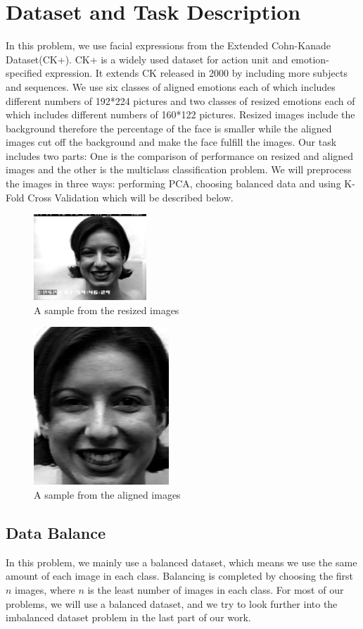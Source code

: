 \documentclass{article} %
\begin{document}
\section{Dataset and Task Description}
In this problem, we use facial expressions from the Extended Cohn-Kanade Dataset(CK+). CK+ is a widely used dataset for action unit
and emotion-specified expression. It extends CK released in 2000 by including more subjects and sequences. We use six classes of aligned emotions each of which includes different numbers of 192*224 pictures and two classes of resized emotions each of which includes different numbers of 160*122 pictures. Resized images include the background therefore the percentage of the face is smaller while the aligned images cut off the background and make the face fulfill the images. 
Our task includes two parts: One is the comparison of performance on resized and aligned images and the other is the multiclass classification problem. We will preprocess the images in three ways: performing PCA, choosing balanced data and using K-Fold Cross Validation which will be described below.
\begin{figure}	
	\centering
	\includegraphics[scale=1]{./graph/resized_sample.png}
	\caption{A sample from the resized images}
\end{figure}
\begin{figure}	
	\centering
	\includegraphics[scale=0.6]{./graph/aligned_sample.png}
	\caption{A sample from the aligned images}
\end{figure}
\subsection {Data Balance}
In this problem, we mainly use a balanced dataset, which means we use the same amount of each image in each class. Balancing is completed by choosing the first $n$ images, where $n$ is the least number of images in each class. For most of our problems, we will use a balanced dataset, and we try to look further into the imbalanced dataset problem in the last part of our work.
\end{document}

